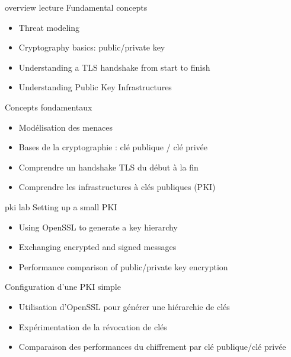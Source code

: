 \def \trainers {mathieu-dubois-briand,olivier-benjamin}

\def \onsitelecturetimeratio{40}
\def \onsitelabtimeratio{60}


{overview}
{lecture}
{Fundamental concepts}
{
  \begin{itemize}
  \item Threat modeling
  \item Cryptography basics: public/private key
  \item Understanding a TLS handshake from start to finish
  \item Understanding Public Key Infrastructures
  \end{itemize}
}
{Concepts fondamentaux}
{
  \begin{itemize}
  \item Modélisation des menaces
  \item Bases de la cryptographie : clé publique / clé privée
  \item Comprendre un handshake TLS du début à la fin
  \item Comprendre les infrastructures à clés publiques (PKI)
  \end{itemize}
}

{pki}
{lab}
{Setting up a small PKI}
{
  \begin{itemize}
  \item Using OpenSSL to generate a key hierarchy
  \item Exchanging encrypted and signed messages
  \item Performance comparison of public/private key encryption
  \end{itemize}
}
{Configuration d'une PKI simple}
{
  \begin{itemize}
  \item Utilisation d’OpenSSL pour générer une hiérarchie de clés
  \item Expérimentation de la révocation de clés
  \item Comparaison des performances du chiffrement par clé publique/clé privée
  \end{itemize}
}

